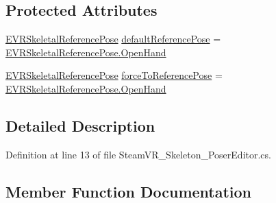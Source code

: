 \subsection*{Protected Attributes}
\begin{DoxyCompactItemize}
\item 
\mbox{\hyperlink{namespace_valve_1_1_v_r_a299b655881f873256f035349b59da09e}{E\+V\+R\+Skeletal\+Reference\+Pose}} \mbox{\hyperlink{class_valve_1_1_v_r_1_1_steam_v_r___skeleton___poser_editor_ac446969b5aaaa2bd8fd4515dc7eac188}{default\+Reference\+Pose}} = \mbox{\hyperlink{namespace_valve_1_1_v_r_a299b655881f873256f035349b59da09eaad39746cdba57cad436b509f2f991d22}{E\+V\+R\+Skeletal\+Reference\+Pose.\+Open\+Hand}}
\item 
\mbox{\hyperlink{namespace_valve_1_1_v_r_a299b655881f873256f035349b59da09e}{E\+V\+R\+Skeletal\+Reference\+Pose}} \mbox{\hyperlink{class_valve_1_1_v_r_1_1_steam_v_r___skeleton___poser_editor_ac9a14861334577353dddafd5f35f5b0f}{force\+To\+Reference\+Pose}} = \mbox{\hyperlink{namespace_valve_1_1_v_r_a299b655881f873256f035349b59da09eaad39746cdba57cad436b509f2f991d22}{E\+V\+R\+Skeletal\+Reference\+Pose.\+Open\+Hand}}
\end{DoxyCompactItemize}


\subsection{Detailed Description}


Definition at line 13 of file Steam\+V\+R\+\_\+\+Skeleton\+\_\+\+Poser\+Editor.\+cs.



\subsection{Member Function Documentation}
\mbox{\label{class_valve_1_1_v_r_1_1_steam_v_r___skeleton___poser_editor_a86f575b35336394ee25e91f1e14c5257}} 
